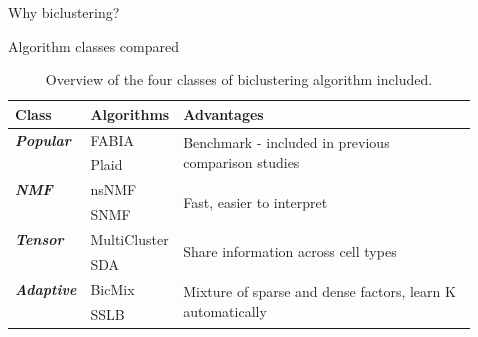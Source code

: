 \documentclass[final]{beamer}
\newlength{\sepwid}
\newlength{\onecolwid}
\begin{document}
\begin{frame}[t]
\begin{columns}[t]
\begin{column}{\onecolwid}
\begin{block}{Why biclustering?}
\end{block}







\begin{block}{Algorithm classes compared}

\begin{table}[t!]
    \caption{Overview of the four classes of biclustering algorithm included.}

    \begin{tabular}{ l | l | l }
\hline
\textbf{Class} & \textbf{Algorithms} & \textbf{Advantages} \\ \hline
    \textbf{\textit{Popular}} & FABIA & \multirow{2}{0.55 \textwidth}{Benchmark - included in previous comparison studies} \\
     & Plaid & \\ \hline
    \textbf{\textit{NMF}} & nsNMF & \multirow{2}{0.55 \textwidth}{Fast, easier to interpret} \\
     & SNMF & \\ \hline
    \textbf{\textit{Tensor}} & MultiCluster & \multirow{2}{0.55 \textwidth}{Share information across cell types} \\
     & SDA & \\ \hline
    \textbf{\textit{Adaptive}} & BicMix & \multirow{2}{0.55 \textwidth}{Mixture of sparse and dense factors, learn K automatically} \\
     & SSLB & \\ \hline
\end{tabular}
\end{table}

\end{block}



\end{column} %

\begin{column}{\sepwid}\end{column} %

\begin{column}{\onecolwid} %


\end{column}
\end{columns}
\end{frame}
\end{document}
